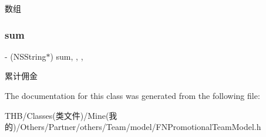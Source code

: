 数组 \mbox{\label{interface_f_n_promotional_team_model_a2a2850656573bfedfc81194156cc6d12}} 
\subsubsection{\texorpdfstring{sum}{sum}}
{\footnotesize\ttfamily -\/ (N\+S\+String$\ast$) sum\hspace{0.3cm}{\ttfamily [read]}, {\ttfamily [write]}, {\ttfamily [nonatomic]}, {\ttfamily [copy]}}

累计佣金 

The documentation for this class was generated from the following file\+:\begin{DoxyCompactItemize}
\item 
T\+H\+B/\+Classes(类文件)/\+Mine(我的)/\+Others/\+Partner/others/\+Team/model/F\+N\+Promotional\+Team\+Model.\+h\end{DoxyCompactItemize}
